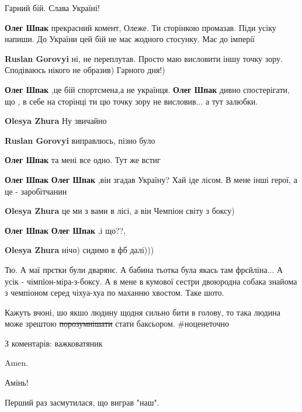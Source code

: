 \begin{itemize}
Гарний бій. Слава Україні!

\begin{itemize} %
\textbf{Олег Шпак} прекрасний комент, Олеже. Ти сторінкою промазав. Піди усіку напиши. До України цей бій не має жодного стосунку. Має до імперії

\textbf{Ruslan Gorovyi} ні, не переплутав. Просто маю висловити іншу точку зору. Сподіваюсь нікого не образив) Гарного дня!)

\textbf{Олег Шпак} ,це бій спортсмена,а не українця.
\textbf{Олег Шпак} дивно спостерігати, що , в себе на сторінці ти цю точку зору не висловив... а тут залюбки.

\textbf{Olesya Zhura} Ну звичайно

\textbf{Ruslan Gorovyi} виправлюсь, пізно було

\textbf{Олег Шпак} та мені все одно. Тут же встиг

\textbf{Олег Шпак} \textbf{Олег Шпак} ,він згадав Україну? Хай іде лісом. В мене інші герої, а це - заробітчанин

\textbf{Olesya Zhura} це ми з вами в лісі, а він Чемпіон світу з боксу)

\textbf{Олег Шпак} \textbf{Олег Шпак} ,і що??,

\textbf{Olesya Zhura} нічо) сидимо в фб далі)))


Тю.
А маї прєтки були дварянє.
А бабина тьотка була якась там фрєйліна...
А усік - чімпіон-міра-з-боксу.
А в мене в кумової сестри двоюродна собака знайома з чемпіоном серед чіхуа-хуа по маханню хвостом.
Таке шото.

Кажуть вчоні, шо якшо людину щодня сильно бити в голову, то така людина може зрештою 
\sout{порозумнішати} стати баксьором. \#ноценеточно

\end{itemize} %

З коментарів: важковатяник

Amen.


Амінь!

Перший раз засмутилася, що виграв "наш".


\end{itemize}
